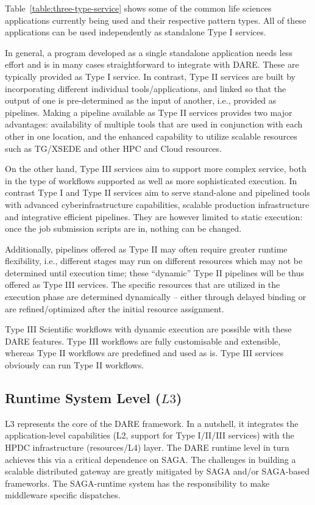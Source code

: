 \documentclass[]{svjour3}
\begin{document}
Table~\ref{table:three-type-service} shows some of the common life sciences
applications currently being used and their respective pattern types. All
of these applications can be used independently as standalone Type I services.

In general, a program developed as a single standalone application needs
less effort and is in many cases straightforward to integrate with
DARE. These are typically provided as Type I service. In contrast,
Type II services are built by incorporating different individual
tools/applications, and linked so that the output of one is
pre-determined as the input of another, i.e., provided as pipelines.
Making a pipeline available as Type II services provides
two major advantages: availability of multiple tools that are used in
conjunction with each other in one location, and the enhanced
capability to utilize scalable resources such as TG/XSEDE and other
HPC and Cloud resources.

On the other hand, Type III services aim to support more complex
service, both in the type of workflows supported as well as more
sophisticated execution. In contrast Type I and Type II
services aim to serve stand-alone and pipelined tools with
advanced cyberinfrastructure capabilities, scalable production infrastructure and
integrative efficient pipelines. They are however limited to static execution:
once the job submission scripts are in, nothing can be changed.

Additionally, pipelines offered as Type II may often require greater
runtime flexibility, i.e., different stages may run on different
resources which may not be determined until execution time; these
``dynamic'' Type II pipelines will be thus offered as Type III
services. The specific resources that are utilized in the
execution phase are determined dynamically -- either through delayed
binding or are refined/optimized after the initial resource
assignment.

Type III Scientific workflows with dynamic execution are possible with
these DARE features. Type III workflows are fully customisable and
extensible, whereas Type II workflows are predefined and used as is.
Type III services obviously can run Type II workflows.

\subsection{Runtime System Level ($L3$)}

L3 represents the core of the DARE framework. In a nutshell, it
integrates the application-level capabilities (L2, support for Type
I/II/III services) with the HPDC infrastructure (resources/L4) layer. The DARE
runtime level in turn achieves this via a critical dependence on
SAGA. The challenges in building a scalable distributed gateway are
greatly mitigated by SAGA and/or SAGA-based frameworks. The
SAGA-runtime system has the responsibility to make middleware specific
dispatches.
\end{document}
